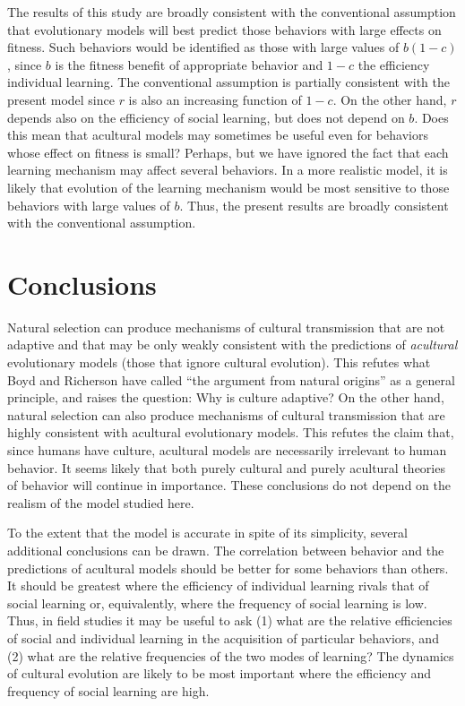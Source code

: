 \documentclass[11pt]{article}
\begin{document}
The results of this study are broadly consistent with the conventional
assumption that evolutionary models will best predict those behaviors with
large effects on fitness.  Such behaviors would be identified as those
with large values of $b(1 - c)$, since $b$ is the fitness benefit of
appropriate behavior and $1 - c$ the efficiency individual learning.  The
conventional assumption is partially consistent with the present model
since $r$ is also an increasing function of $1 - c$. On the other hand, $r$
depends also on the efficiency of social learning, but does not depend on
$b$.  Does this mean that acultural models may sometimes be useful even
for behaviors whose effect on fitness is small?  Perhaps, but we have
ignored the fact that each learning mechanism may affect several
behaviors.  In a more realistic model, it is likely that evolution of the
learning mechanism would be most sensitive to those behaviors with large
values of $b$.  Thus, the present results are broadly consistent with the
conventional assumption. 

\section{Conclusions}

Natural selection can produce mechanisms of cultural transmission that are
not adaptive and that may be only weakly consistent with the predictions
of \emph{acultural} evolutionary models (those that ignore cultural
evolution).  This refutes what Boyd and Richerson have called ``the
argument from natural origins'' as a general principle, and raises the
question: Why is culture adaptive?  On the other hand, natural selection
can also produce mechanisms of cultural transmission that are highly
consistent with acultural evolutionary models.  This refutes the claim
that, since humans have culture, acultural models are necessarily
irrelevant to human behavior.  It seems likely that both purely cultural
and purely acultural theories of behavior will continue in importance.
These conclusions do not depend on the realism of the model studied here. 

To the extent that the model is accurate in spite of its simplicity,
several additional conclusions can be drawn.  The correlation between
behavior and the predictions of acultural models should be better for some
behaviors than others.  It should be greatest where the efficiency of
individual learning rivals that of social learning or, equivalently, where
the frequency of social learning is low. Thus, in field studies it may be
useful to ask (1) what are the relative efficiencies of social and
individual learning in the acquisition of particular behaviors, and (2)
what are the relative frequencies of the two modes of learning?  The
dynamics of cultural evolution are likely to be most important where the
efficiency and frequency of social learning are high.  
\end{document}
